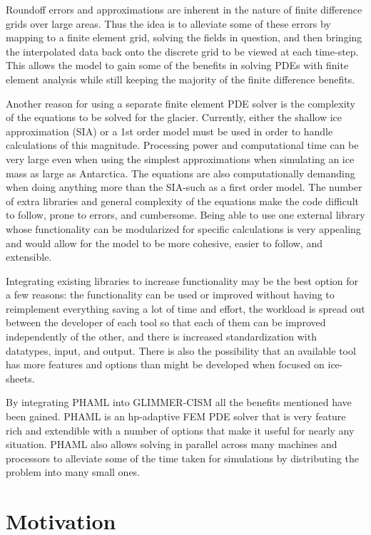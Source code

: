 Roundoff errors and approximations are inherent in the nature of finite difference grids over large areas.  Thus the idea is to alleviate some of these errors by mapping to a finite element grid, solving the fields in question, and then bringing the interpolated data back onto the discrete grid to be viewed at each time-step.  This allows the model to gain some of the benefits in solving PDEs with finite element analysis while still keeping the majority of the finite difference benefits.

Another reason for using a separate finite element PDE solver is the complexity of the equations to be solved for the glacier.  Currently, either the shallow ice approximation (SIA) or a 1st order model must be used in order to handle calculations of this magnitude.  Processing power and computational time can be very large even when using the simplest approximations when simulating an ice mass as large as Antarctica.  The equations are also computationally demanding when doing anything more than the SIA-such as a first order model.  The number of extra libraries and general complexity of the equations make the code difficult to follow, prone to errors, and cumbersome.  Being able to use one external library whose functionality can be modularized for specific calculations is very appealing and would allow for the model to be more cohesive, easier to follow, and extensible. 


Integrating existing libraries to increase functionality may be the best option for a few reasons: the functionality can be used or improved without having to reimplement everything saving a lot of time and effort, the workload is spread out between the developer of each tool so that each of them can be improved independently of the other, and there is increased standardization with datatypes, input, and output.  There is also the possibility that an available tool has more features and options than might be developed when focused on ice-sheets.

By integrating PHAML into GLIMMER-CISM all the benefits mentioned have been gained.  PHAML is an hp-adaptive FEM PDE solver that is very feature rich and extendible with a number of options that make it useful for nearly any situation.  PHAML also allows solving in parallel across many machines and processors to alleviate some of the time taken for simulations by distributing the problem into many small ones.


\section{Motivation}\label{sec:chp1motivation}

